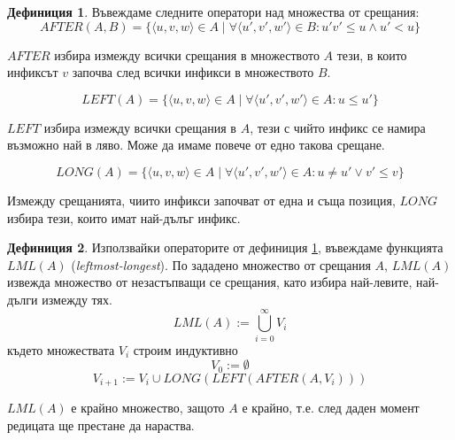 \documentclass[12pt, oneside]{article}
\theoremstyle{definition}
\newtheorem{definition}{Дефиниция}[section]
\begin{document}
\begin{definition}\label{def:LmlOps}
	Въвеждаме следните оператори над множества от срещания:
\[ AFTER(A, B) = \{ \langle u, v, w \rangle \in A \mid \forall \langle u', v', w' \rangle \in B : u'v' \leq u \land u' < u  \} \] 

\( AFTER \) избира измежду всички срещания в множеството \(A\) тези, в които инфиксът \(v\) започва след всички инфикси в множеството \(B\).

\[ LEFT(A) = \{ \langle u, v, w \rangle \in A \mid \forall \langle u', v', w' \rangle \in A : u \leq u' \} \]

\( LEFT \) избира измежду всички срещания в \(A\), тези с чийто инфикс се намира възможно най в ляво. Може да имаме повече от едно такова срещане.

\[ LONG(A) = \{ \langle u, v, w \rangle \in A \mid \forall \langle u', v', w' \rangle \in A : u \neq u' \lor v' \leq v \} \]

Измежду срещанията, чиито инфикси започват от една и съща позиция, \( LONG \) избира тези, които имат най-дълъг инфикс.
\end{definition}

\begin{definition}
	Използвайки операторите от дефиниция \ref{def:LmlOps}, въвеждаме функцията \( LML(A) \) (\emph{leftmost-longest}). По зададено множество от срещания \(A\), \( LML(A) \) извежда множество от незастъпващи се срещания, като избира най-левите, най-дълги измежду тях.
	\[ LML(A) := \bigcup\limits_{i=0}^{\infty} V_{i} \]
	където множествата \( V_i \) строим индуктивно
	\[ V_0 := \emptyset \]
	\[ V_{i+1} := V_i \cup LONG(LEFT(AFTER(A, V_i))) \]

	\noindent \( LML(A) \) е крайно множество, защото \( A \) е крайно, т.е. след даден момент редицата ще престане да нараства.
\end{definition}
\end{document}
